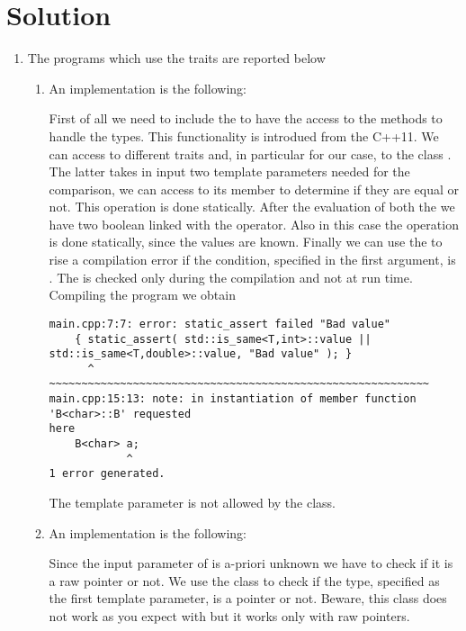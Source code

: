 \section*{Solution}

%    

\begin{enumerate}

    \item The programs which use the traits are reported below

    \begin{enumerate}

        \item An implementation is the following:
        \lstset{basicstyle=\scriptsize\sf}
        
        \lstset{basicstyle=\sf}
        First of all we need to include the  to have the access to
        the methods to handle the types. This functionality is introdued from the C++11.
        We can access to different traits and, in particular for our case, to the class
        . The latter takes in input two template parameters needed for
        the comparison, we can access to its member  to determine if they
        are equal or not.  This operation is done statically. After the evaluation of
        both the  we have two boolean linked with the \cpp{||}
        operator.  Also in this case the operation is done statically, since the
        values
        are known.  Finally we can use the  to rise a compilation
        error if the condition, specified in the first argument, is .
        The  is checked only during the compilation and not at
        run time. \\
        Compiling the program we obtain
        \begin{verbatim}
main.cpp:7:7: error: static_assert failed "Bad value"
    { static_assert( std::is_same<T,int>::value ||
std::is_same<T,double>::value, "Bad value" ); }
      ^              ~~~~~~~~~~~~~~~~~~~~~~~~~~~~~~~~~~~~~~~~~~~~~~~~~~~~~~~~~~~
main.cpp:15:13: note: in instantiation of member function 'B<char>::B' requested
here
    B<char> a;
            ^
1 error generated.
        \end{verbatim}
        The template parameter  is not allowed by the class.

        \item An implementation is the following:
        \lstset{basicstyle=\scriptsize\sf}
        
        \lstset{basicstyle=\sf}
        Since the input parameter of  is a-priori unknown we have to
        check if it is a raw pointer or not. We use the class 
        to check if the type, specified as the first template parameter, is a
        pointer or not.
        Beware, this class does not work as you expect with 
        but it works only with raw pointers.


\end{enumerate}
\end{enumerate}
